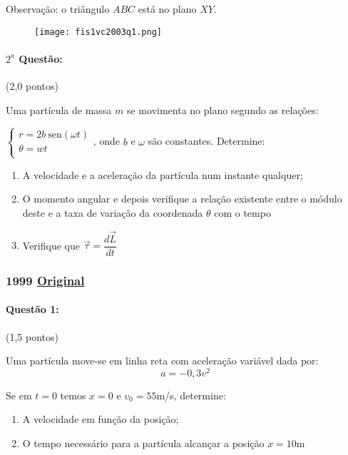 \documentclass[12pt,a4paper]{article}
\newcommand{\sen}{\mathrm{sen}}
\newcommand{\original}[1]{\tiny \href{#1}{Original} \normalsize}
\begin{document}
Observação: o triângulo $ABC$ está no plano $XY$.

\begin{figure}[ht]
\centering
\texttt{[image: fis1vc2003q1.png]}
\end{figure}

\paragraph{$2^a$ Questão:} (2,0 pontos)

Uma partícula de massa $m$ se movimenta no plano segundo as relações:


$
\begin{cases}
r=2b \ \sen (\omega t)\\
\theta = wt \\
\end{cases}
$, onde $b$ e $\omega$ são constantes.
\vspace{0.5cm}
Determine:
\begin{enumerate}[label=\alph*)]
\item A velocidade e a aceleração da partícula num instante qualquer;
\item O momento angular e depois verifique a relação existente entre o módulo deste e a taxa de variação da coordenada $\theta$ com o tempo
\item Verifique que $\overrightarrow{\tau} = \dfrac{d\overrightarrow{L}}{dt} $
\end{enumerate}
\newpage

\subsubsection{1999 \original{https://drive.google.com/file/d/1k_gY1BbPEzPreiuaKeLreQ0r2AXyRHKL/view?usp=sharing}}

\paragraph{Questão 1:} (1,5 pontos)

Uma partícula move-se em linha reta com aceleração variável dada por:
$$ a = -0,3v^2 $$

Se em $t=0$ temos $x=0$ e $v_0=55$m/s, determine:
\begin{enumerate}[label=\alph*)]
\item A velocidade em função da posição;
\item O tempo necessário para a partícula alcançar a posição $x=10$m
\end{enumerate}
\end{document}
